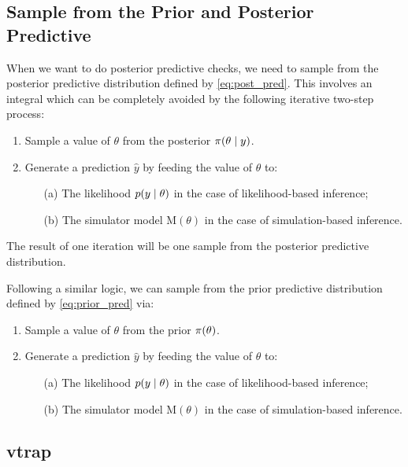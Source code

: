 \subsection{Sample from the Prior and Posterior Predictive} 

When we want to do posterior predictive checks, we need to sample from the posterior predictive distribution defined by \autoref{eq:post_pred}. This involves an integral which can be completely avoided by the following iterative two-step process:
\begin{enumerate}
    \item Sample a value of $\theta$ from the posterior $\pi \qty(\theta \mid y)$. 
    \item Generate a prediction $\hat{y}$ by feeding the value of $\theta$ to:
    \begin{itemize}
        \item[(a)] The likelihood $p \qty(y \mid \theta)$ in the case of likelihood-based inference;
        \item[(b)] The simulator model $\mathrm{M}(\theta)$ in the case of simulation-based inference. 
    \end{itemize}
\end{enumerate}

The result of one iteration will be one sample from the posterior predictive distribution. 

Following a similar logic, we can sample from the prior predictive distribution defined by \autoref{eq:prior_pred} via: 
\begin{enumerate}
    \item Sample a value of $\theta$ from the prior $\pi \qty(\theta)$. 
    \item Generate a prediction $\hat{y}$ by feeding the value of $\theta$ to:
    \begin{itemize}
        \item[(a)] The likelihood $p \qty(y \mid \theta)$ in the case of likelihood-based inference;
        \item[(b)] The simulator model $\mathrm{M}(\theta)$ in the case of simulation-based inference. 
    \end{itemize}
\end{enumerate}

\subsection{vtrap} 

